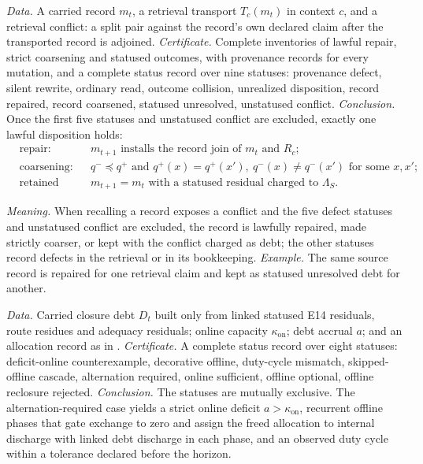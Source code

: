 \begin{schema}[E14: reconsolidation]\label{tmpl:e14}
\emph{Data.} A carried record $m_t$, a retrieval transport $T_c(m_t)$ in context $c$, and a retrieval
conflict: a split pair against the record's own declared claim after the transported record is
adjoined.
\emph{Certificate.} Complete inventories of lawful repair, strict coarsening and statused outcomes,
with provenance records for every mutation, and a complete status record over nine statuses:
provenance defect, silent rewrite, ordinary read, outcome collision, unrealized disposition, record
repaired, record coarsened, statused unresolved, unstatused conflict.
\emph{Conclusion.} Once the first five statuses and unstatused conflict are excluded, exactly one
lawful disposition holds:
\[
\begin{aligned}
  &\text{repair:} && m_{t+1} \text{ installs the record join of } m_t \text{ and } R_c;\\
  &\text{coarsening:} && q^- \preceq q^+ \text{ and } q^+(x) = q^+(x'),\ q^-(x) \ne q^-(x')
     \text{ for some } x, x';\\
  &\text{retained debt:} && m_{t+1} = m_t \text{ with a statused residual charged to } \Lambda_S.
\end{aligned}
\]
\end{schema}

\emph{Meaning.} When recalling a record exposes a conflict and the five defect statuses and unstatused
conflict are excluded,
the record is lawfully repaired, made strictly coarser, or kept with the conflict charged as debt; the
other statuses record defects in the retrieval or in its bookkeeping.
\emph{Example.} The same source record is repaired for one retrieval claim and kept as statused
unresolved debt for another.

\begin{schema}\label{tmpl:e15}
\emph{Data.} Carried closure debt $D_t$ built only from linked statused E14 residuals, route residues
and adequacy residuals; online capacity $\kappa_{\mathrm{on}}$; debt accrual $a$; and an allocation
record as in .
\emph{Certificate.} A complete status record over eight statuses: deficit-online counterexample,
decorative offline, duty-cycle mismatch, skipped-offline cascade, alternation required, online
sufficient, offline optional, offline reclosure rejected.
\emph{Conclusion.} The statuses are mutually exclusive. The alternation-required case yields a strict
online deficit $a > \kappa_{\mathrm{on}}$, recurrent offline phases that gate exchange to zero and
assign the freed allocation to internal discharge with linked debt discharge in each phase, and an
observed duty cycle within a tolerance declared before the horizon.
\end{schema}

